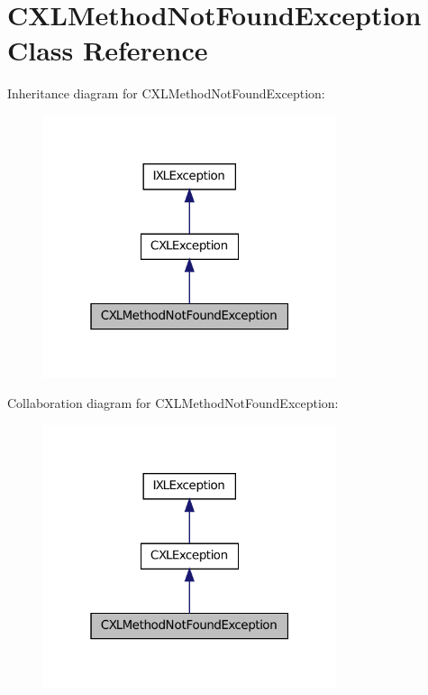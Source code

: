 \hypertarget{classCXLMethodNotFoundException}{
\section{CXLMethodNotFoundException Class Reference}
\label{classCXLMethodNotFoundException}
}


Inheritance diagram for CXLMethodNotFoundException:\nopagebreak
\begin{figure}[H]
\begin{center}
\leavevmode
\includegraphics[width=244pt]{classCXLMethodNotFoundException__inherit__graph}
\end{center}
\end{figure}


Collaboration diagram for CXLMethodNotFoundException:\nopagebreak
\begin{figure}[H]
\begin{center}
\leavevmode
\includegraphics[width=244pt]{classCXLMethodNotFoundException__coll__graph}
\end{center}
\end{figure}


